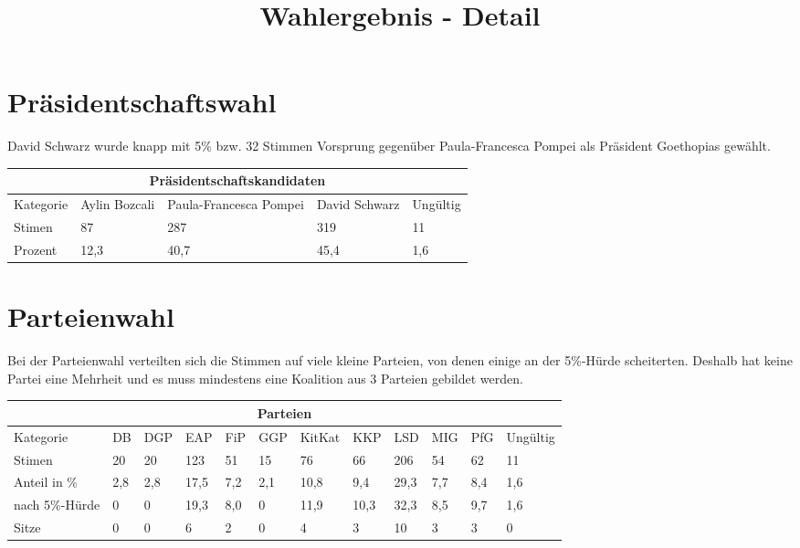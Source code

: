 \documentclass{sasbase}
\begin{document}
\onecolumn
\title{Wahlergebnis - Detail}

\mytitle

\setlength{\parindent}{0mm}
\setlength{\parskip}{2mm}
\renewcommand{\arraystretch}{1.3}

\section{Präsidentschaftswahl}

David Schwarz wurde knapp mit 5\% bzw. 32 Stimmen Vorsprung gegenüber Paula-Francesca Pompei als Präsident Goethopias gewählt.

\begin{center}
    \begin{tabular}{ |p{3cm}||p{3cm}|p{3cm}|p{3cm}|p{3cm}|  }
     \hline
     \multicolumn{5}{|c|}{Präsidentschaftskandidaten} \\
     \hline
     Kategorie & Aylin Bozcali  & Paula-Francesca Pompei & David Schwarz & Ungültig\\
     \hline
     Stimen   & 87    & 287 &   319 & 11 \\
     Prozent &  12,3  & 40,7   & 45,4 & 1,6 \\
     \hline
    \end{tabular}
\end{center}


\section{Parteienwahl}

Bei der Parteienwahl verteilten sich die Stimmen auf viele kleine Parteien, von denen
einige an der 5\%-Hürde scheiterten. Deshalb hat keine Partei eine Mehrheit und es muss
mindestens eine Koalition aus 3 Parteien gebildet werden.

\vspace{5mm}
\begin{tabular}{ |p{3cm}||p{1cm}|p{1cm}|p{1cm}|p{1cm}|p{1cm}|p{1cm}|p{1cm}|p{1cm}|p{1cm}|p{1cm}|p{1.2cm}|  }
     \hline
     \multicolumn{12}{|c|}{Parteien} \\
     \hline
     Kategorie & DB & DGP & EAP & FiP & GGP & KitKat & KKP & LSD & MIG & PfG & Ungültig\\
     \hline
     Stimen   & 20 & 20  & 123 & 51 & 15 & 76 & 66 & 206 & 54 & 62 & 11 \\
     Anteil in \%  & 2,8 & 2,8  & 17,5 & 7,2 & 2,1 & 10,8 & 9,4 & 29,3 & 7,7 & 8,4 & 1,6 \\
    nach 5\%-Hürde  & 0 & 0 & 19,3  & 8,0 & 0 & 11,9 & 10,3 & 32,3 & 8,5 & 9,7 & 1,6 \\
     \hline
      \hline
     Sitze & 0 & 0 & 6 & 2 & 0 & 4 & 3 & 10 & 3 & 3 & 0\\
     \hline
\end{tabular}
\end{document}

